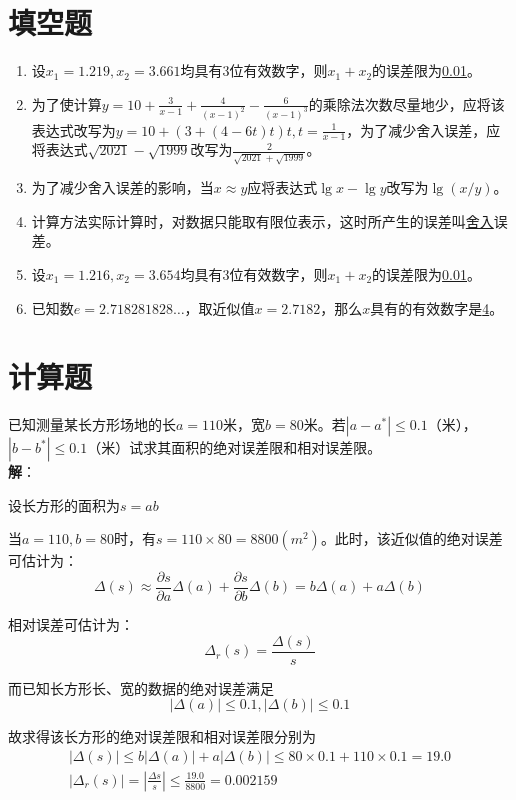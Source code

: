 \documentclass[UTF8,a4paper,11pt,oneside]{ctexbook}
\begin{document}
\section{填空题}
\begin{enumerate}
    \item 设\(x_1=1.219,x_2=3.661\)均具有3位有效数字，则\(x_1+x_2\)的误差限为\underline{0.01}。
    \item 为了使计算\(y=10+\frac{3}{x-1}+\frac{4}{(x-1)^2}-\frac{6}{(x-1)^3}\)的乘除法次数尽量地少，应将该表达式改写为\underline{\(y=10+(3+(4-6t)t)t,t=\frac{1}{x-1}\)}，为了减少舍入误差，应将表达式\(\sqrt{2021}-\sqrt{1999}\)改写为\underline{\(\frac{2}{\sqrt{2021}+\sqrt{1999}}\)}。
    \item 为了减少舍入误差的影响，当\(x\approx y\)应将表达式\(\lg x-\lg y\)改写为\underline{\(\lg (x/y)\)}。
    \item 计算方法实际计算时，对数据只能取有限位表示，这时所产生的误差叫\underline{舍入}误差。
    \item 设\(x_1=1.216,x_2=3.654\)均具有3位有效数字，则\(x_1+x_2\)的误差限为\underline{0.01}。
    \item 已知数\(e=2.718281828\ldots\)，取近似值\(x=2.7182\)，那么\(x\)具有的有效数字是\underline{4}。
\end{enumerate}

\section{计算题}

已知测量某长方形场地的长\(a=110\)米，宽\(b=80\)米。若\(|a-a^*|\leq0.1\)（米），\(|b-b^*|\leq0.1\)（米）试求其面积的绝对误差限和相对误差限。\\
\textbf{解}：

设长方形的面积为\(s=ab\)

当\(a=110,b=80\)时，有\(s=110\times80=8800(m^2)\)。此时，该近似值的绝对误差可估计为：
\[
\Delta(s)\approx\frac{\partial s}{\partial a}\Delta(a)+\frac{\partial s}{\partial b}\Delta(b)=b\Delta(a)+a\Delta(b)
\]

相对误差可估计为：
\[
\Delta_r(s)=\frac{\Delta (s)}{s}
\]

而已知长方形长、宽的数据的绝对误差满足
\[
|\Delta(a)|\leq0.1,|\Delta(b)|\leq0.1
\]

故求得该长方形的绝对误差限和相对误差限分别为
\begin{gather*}
    |\Delta(s)|\leq b|\Delta(a)|+a|\Delta(b)|\leq80\times0.1+110\times0.1=19.0\\
    |\Delta_r(s)|=\left|\frac{\Delta s}{s}\right|\leq\frac{19.0}{8800}=0.002159
\end{gather*}
\end{document}
